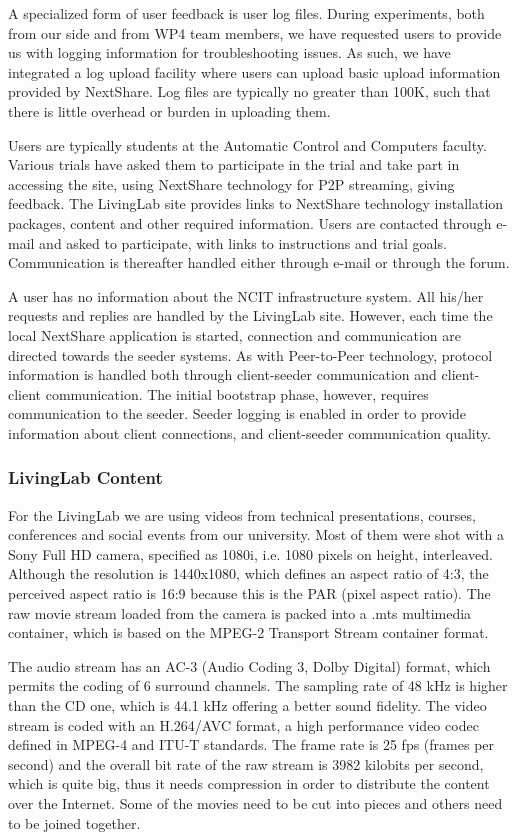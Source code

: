 A specialized form of user feedback is user log files. During experiments,
both from our side and from WP4 team members, we have requested users to
provide us with logging information for troubleshooting issues. As such, we
have integrated a log upload facility where users can upload basic upload
information provided by NextShare. Log files are typically no greater than
100K, such that there is little overhead or burden in uploading them.

Users are typically students at the Automatic Control and Computers faculty.
Various trials have asked them to participate in the trial and take part in
accessing the site, using NextShare technology for P2P streaming, giving
feedback. The LivingLab site provides links to NextShare technology
installation packages, content and other required information. Users are
contacted through e-mail and asked to participate, with links to instructions
and trial goals. Communication is thereafter handled either through e-mail or
through the forum.

A user has no information about the NCIT infrastructure system. All his/her
requests and replies are handled by the LivingLab site. However, each time
the local NextShare application is started, connection and communication are
directed towards the seeder systems. As with Peer-to-Peer technology, protocol
information is handled both through client-seeder communication and
client-client communication. The initial bootstrap phase, however, requires
communication to the seeder. Seeder logging is enabled in order to provide
information about client connections, and client-seeder communication quality.

\subsubsection{LivingLab Content}

For the LivingLab we are using videos from technical presentations, courses,
conferences and social events from our university. Most of them were shot with
a Sony Full HD camera, specified as 1080i, i.e. 1080 pixels on height,
interleaved. Although the resolution is 1440x1080, which defines an aspect
ratio of 4:3, the perceived aspect ratio is 16:9 because this is the PAR
(pixel aspect ratio). The raw movie stream loaded from the camera is packed
into a .mts multimedia container, which is based on the MPEG-2 Transport
Stream container format.

The audio stream has an AC-3 (Audio Coding 3, Dolby Digital) format, which
permits the coding of 6 surround channels. The sampling rate of 48 kHz is
higher than the CD one, which is 44.1 kHz offering a better sound fidelity.
The video stream is coded with an H.264/AVC format, a high performance video
codec defined in MPEG-4 and ITU-T standards.  The frame rate is 25 fps (frames
per second) and the overall bit rate of the raw stream is 3982 kilobits per
second, which is quite big, thus it needs compression in order to distribute
the content over the Internet. Some of the movies need to be cut into pieces
and others need to be joined together.

